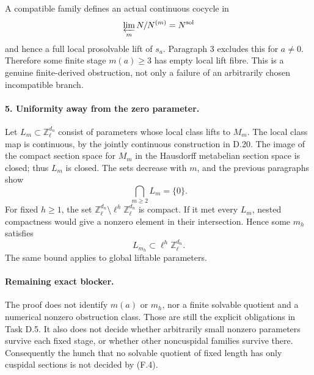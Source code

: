 A compatible family defines an actual continuous cocycle
in
\[
        \varprojlim_m N/N^{(m)}=N^{\rm sol}
\]
and hence a full local prosolvable lift of $s_a$.  Paragraph 3
excludes this for $a\ne0$.  Therefore some finite stage
$m(a)\ge3$ has empty local lift fibre.  This is a genuine
finite-derived obstruction, not only a failure of an
arbitrarily chosen incompatible branch.

\paragraph{5. Uniformity away from the zero parameter.}

Let $L_m\subset\mathbb Z_\ell^{d_n}$ consist of parameters
whose local class lifts to $M_m$.  The local class map is
continuous, by the jointly continuous construction in D.20.
The image of the compact section space for $M_m$ in the
Hausdorff metabelian section space is closed; thus $L_m$
is closed.  The sets decrease with $m$, and the previous
paragraphs show
\[
                           \bigcap_{m\ge2}L_m=\{0\}.
\]
For fixed $h\ge1$, the set
$\mathbb Z_\ell^{d_n}\setminus\ell^h\mathbb Z_\ell^{d_n}$
is compact.  If it met every $L_m$, nested compactness would
give a nonzero element in their intersection.  Hence some
$m_h$ satisfies
\[
                         L_{m_h}\subset\ell^h\mathbb Z_\ell^{d_n}.
                                                        \tag{F.4}
\]
The same bound applies to global liftable parameters.

\paragraph{Remaining exact blocker.}

The proof does not identify $m(a)$ or $m_h$, nor a finite
solvable quotient and a numerical nonzero obstruction class.
Those are still the explicit obligations in Task D.5.
It also does not decide whether arbitrarily small nonzero
parameters survive each fixed stage, or whether other
noncuspidal families survive there.  Consequently the hunch
that no solvable quotient of fixed length has only cuspidal
sections is not decided by (F.4).
